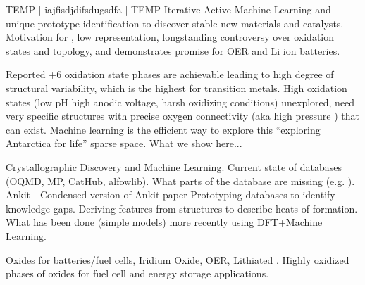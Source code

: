 TEMP | iajfisdjdifsdugsdfa | TEMP
Iterative Active Machine Learning and unique prototype identification to discover stable new materials and catalysts.
Motivation for , low representation, longstanding controversy over oxidation states and topology, and demonstrates promise for OER and Li ion batteries.

Reported +6 oxidation state phases are achievable leading to high degree of structural variability, which is the highest for transition metals.
High oxidation states (low pH high anodic voltage, harsh oxidizing conditions) unexplored, need very specific structures with precise oxygen connectivity (aka high pressure ) that can exist.
Machine learning is the efficient way to explore this “exploring Antarctica for life” sparse space.
What we show here...


Crystallographic Discovery and Machine Learning.
Current state of databases (OQMD, MP, CatHub, alfowlib).
What parts of the database are missing (e.g. ).
Ankit - Condensed version of Ankit paper
Prototyping databases to identify knowledge gaps.
Deriving features from structures to describe heats of formation.
What has been done (simple models) more recently using DFT+Machine Learning.


Oxides for batteries/fuel cells, Iridium Oxide, OER, Lithiated .
Highly oxidized phases of oxides for fuel cell and energy storage applications.
